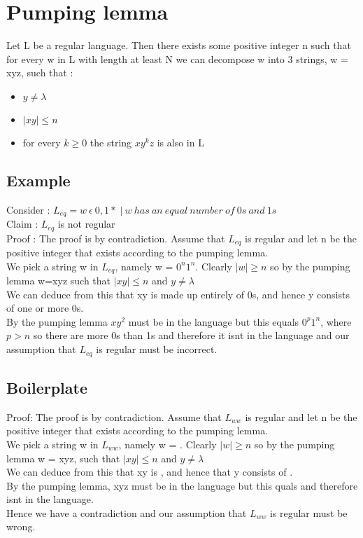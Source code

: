 \documentclass{article}
\begin{document}
\section{Pumping lemma}
Let L be a regular language. Then there exists some positive integer n such that for every w in L with length at least N we can decompose w into 3 strings, w = xyz, such that :
\begin{itemize}
	\item $y \neq \lambda$
	\item $ \left | xy \right | \leq n$
	\item for every $k \geq 0$ the string $xy^kz$ is also in L
\end{itemize}
\subsection{Example}
Consider : $L_{eq} = {w\:\epsilon\:{0,1}*\;|\:w\:has\:an\:equal\:number\:of\:0s\:and\:1s} $\\
Claim : $L_{eq}$ is not regular\\
Proof : The proof is by contradiction. Assume that $L_{eq}$ is regular and let n be the positive integer that exists according to the pumping lemma.\\
We pick a string w in $L_{eq}$, namely w = $0^n1^n$. Clearly $|w| \geq n$ so by the pumping lemma w=xyz such that  $|xy| \leq n$ and $y \neq \lambda$\\
We can deduce from this that xy is made up entirely of 0s, and hence y consists of one or more 0s.\\
By the pumping lemma $xy^2$ must be in the language but this equals $0^p1^n$, where $p > n$ so there are more 0s than 1s and therefore it isnt in the language and our assumption that $L_{eq}$ is regular must be incorrect.
\subsection{Boilerplate}
Proof: The proof is by contradiction. Assume that $L_{ww}$ is regular and let n be the positive integer that exists according to the pumping lemma.\\
We pick a string w in $L_{ww}$, namely w = \qquad. Clearly $|w| \geq n$ so by the pumping lemma w = xyz, such that $|xy| \leq n$ and $y \neq \lambda$\\
We can deduce from this that xy is \qquad \qquad , and hence that y consists of \qquad \qquad.\\
By the pumping lemma, xyz must be in the language but this quals \qquad\qquad\qquad and therefore isnt in the language.\\
Hence we have a contradiction and our assumption that $L_{ww}$ is regular must be wrong.
\end{document}
